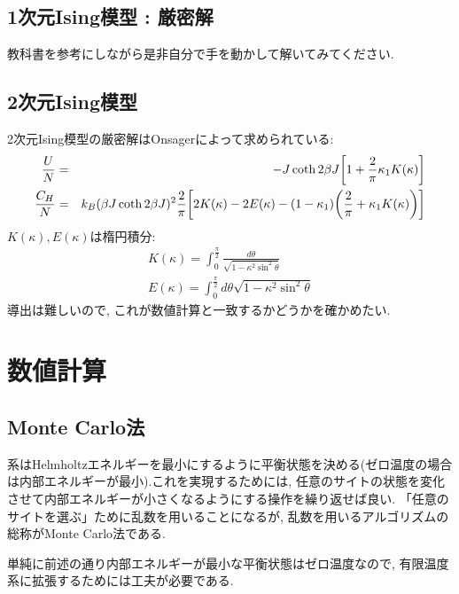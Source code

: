 \documentclass[10.5pt,a4paper]{jreport}
\begin{document}
\subsection{1次元Ising模型 : 厳密解}
教科書を参考にしながら是非自分で手を動かして解いてみてください.
\subsection{2次元Ising模型}
2次元Ising模型の厳密解はOnsagerによって求められている:
\begin{eqnarray}
  \frac{U}{N} &=& -J\coth{2\beta J}\qty[1+\frac{2}{\pi}\kappa_1 K(\kappa)]\\
  \frac{C_H}{N} &=& k_B(\beta J\coth{2\beta J})^2\frac{2}{\pi}\qty[2K(\kappa)-2E(\kappa) - (1-\kappa_1)\qty(\frac{2}{\pi} + \kappa_1K(\kappa))]
\end{eqnarray}
$K(\kappa), E(\kappa)$は楕円積分:
\begin{eqnarray}
  K(\kappa) = \int_0^{\frac{\pi}{2}}\frac{d\theta}{\sqrt{1-\kappa^2\sin^2{\theta}}}\\
  E(\kappa) = \int_0^{\frac{\pi}{2}}d\theta \sqrt{1-\kappa^2\sin^2{\theta}}
\end{eqnarray}
導出は難しいので, これが数値計算と一致するかどうかを確かめたい. 
  
\section{数値計算}
\subsection{Monte Carlo法}
系はHelmholtzエネルギーを最小にするように平衡状態を決める(ゼロ温度の場合は内部エネルギーが最小).これを実現するためには, 任意のサイトの状態を変化させて内部エネルギーが小さくなるようにする操作を繰り返せば良い. 「任意のサイトを選ぶ」ために乱数を用いることになるが, 乱数を用いるアルゴリズムの総称がMonte Carlo法である.

単純に前述の通り内部エネルギーが最小な平衡状態はゼロ温度なので, 有限温度系に拡張するためには工夫が必要である. 
\end{document}
